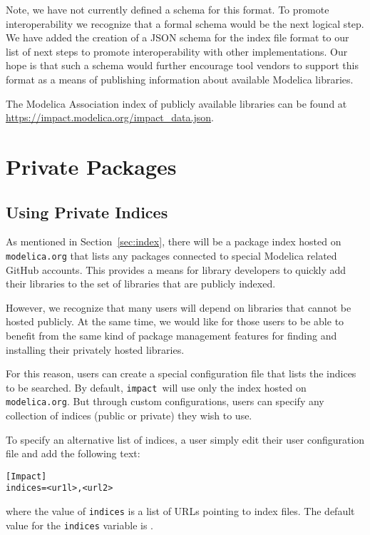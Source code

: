 \documentclass[11pt,a4paper,twocolumn]{article}
\newcommand{\impact}{\texttt{impact}} %
\newcommand{\code}[1]{\texttt{#1}} %
\begin{document}
Note, we have not currently defined a schema for this format.  To
promote interoperability we recognize that a formal schema would be the
next logical step.  We have added the creation of a JSON schema for
the index file format to our list of next steps to promote
interoperability with other implementations.  Our hope is that such a
schema would further encourage tool vendors to support this format as
a means of publishing information about available Modelica libraries.

The Modelica Association index of publicly available libraries can
be found at \url{https://impact.modelica.org/impact\_data.json}.

\section{Private Packages}
\label{sec:private}

\subsection{Using Private Indices}
\label{sec:use_private}

As mentioned in Section~\ref{sec:index}, there will be a package index
hosted on \code{modelica.org} that lists any packages connected to
special Modelica related GitHub accounts.  This provides a means for
library developers to quickly add their libraries to the set of
libraries that are publicly indexed.

However, we recognize that many users will depend on libraries that
cannot be hosted publicly.  At the same time, we would like for those
users to be able to benefit from the same kind of package management
features for finding and installing their privately hosted libraries.

For this reason, users can create a special configuration file that
lists the indices to be searched.  By default, \impact\ will use only
the index hosted on \code{modelica.org}.  But through custom
configurations, users can specify any collection of indices (public or
private) they wish to use.

To specify an alternative list of indices, a user simply edit their
user configuration file and add the following text:

\begin{verbatim}
[Impact]
indices=<ur1l>,<url2>
\end{verbatim}
where the value of \code{indices} is a list of URLs pointing to index
files.  The default value for the \code{indices} variable is \code{}.
\end{document}

